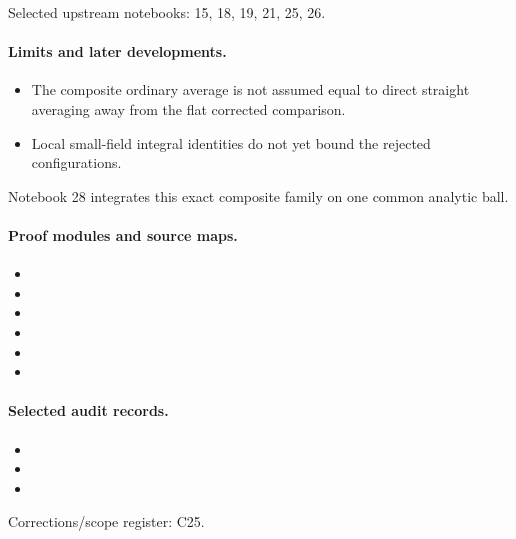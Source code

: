 \documentclass[11pt]{article}
\theoremstyle{remark}
\begin{document}
Selected upstream notebooks: 15, 18, 19, 21, 25, 26.\par

\paragraph{Limits and later developments.}
\begin{itemize}
\item The composite ordinary average is not assumed equal to direct straight averaging away from the flat corrected comparison.
\item Local small-field integral identities do not yet bound the rejected configurations.
\end{itemize}

Notebook 28 integrates this exact composite family on one common analytic ball.

\paragraph{Proof modules and source maps.}
\begingroup\small
\begin{itemize}
\item {}
\item {}
\item {}
\item {}
\item {}
\item {}
\end{itemize}
\endgroup

\paragraph{Selected audit records.}
\begingroup\small
\begin{itemize}
\item {}
\item {}
\item {}
\end{itemize}
\endgroup
Corrections/scope register: C25.\par
\end{document}
